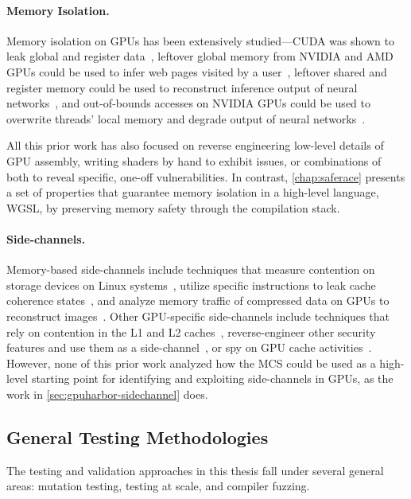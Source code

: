 \paragraph{Memory Isolation.} Memory isolation on GPUs has been extensively studied---CUDA was shown to leak global and register data~\cite{dipietro2016cudaleaks}, leftover global memory from NVIDIA and AMD GPUs could be used to infer web pages visited by a user~\cite{lee2014stealing}, leftover shared and register memory could be used to reconstruct inference output of neural networks~\cite{sorensen2024leftoverlocals,pustelnik2024whispering}, and out-of-bounds accesses on NVIDIA GPUs could be used to overwrite threads' local memory and degrade output of neural networks~\cite{guo2024usenix}.

All this prior work has also focused on reverse engineering low-level details of GPU assembly, writing shaders by hand to exhibit issues, or combinations of both to reveal specific, one-off vulnerabilities. In contrast, \mychap\ref{chap:saferace} presents a set of properties that guarantee memory isolation in a high-level language, WGSL, by preserving memory safety through the compilation stack.

\paragraph{Side-channels.} Memory-based side-channels include techniques that measure contention on storage devices on Linux systems~\cite{jiang2024sync}, utilize specific instructions to leak cache coherence states~\cite{guo2024usenix}, and analyze memory traffic of compressed data on GPUs to reconstruct images~\cite{wang2024gpuzip}. Other GPU-specific side-channels include techniques that rely on contention in the L1 and L2 caches~\cite{naghibijouybari2017constructing}, reverse-engineer other security features and use them as a side-channel~\cite{nazaraliyev2025refresh}, or spy on GPU cache activities~\cite{zhang2024invalidate}. However, none of this prior work analyzed how the MCS could be used as a high-level starting point for identifying and exploiting side-channels in GPUs, as the work in \mysec\ref{sec:gpuharbor-sidechannel} does.

\subsection{General Testing Methodologies}
\label{sec:bg-related-methodologies}

The testing and validation approaches in this thesis fall under several general areas: mutation testing, testing at scale, and compiler fuzzing.


